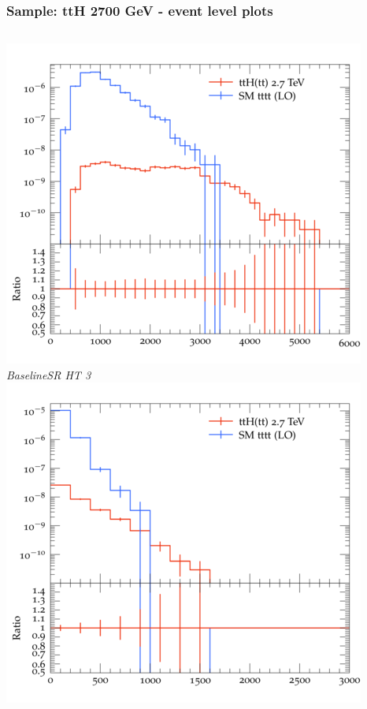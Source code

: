 \documentclass{beamer}
\begin{document}
\begin{frame}
\frametitle{Sample: ttH 2700 GeV - event level plots}
\begin{columns}
\includegraphics[width=\textwidth]{../plots/ttH_2700/tttt_ttH_1LOS/BaselineSR_HT_3.png}\\
\textit{\small BaselineSR HT 3}
\includegraphics[width=\textwidth]{../plots/ttH_2700/tttt_ttH_1LOS/BaselineSR_MET.png}\\

\end{columns}
\end{frame}
\end{document}
